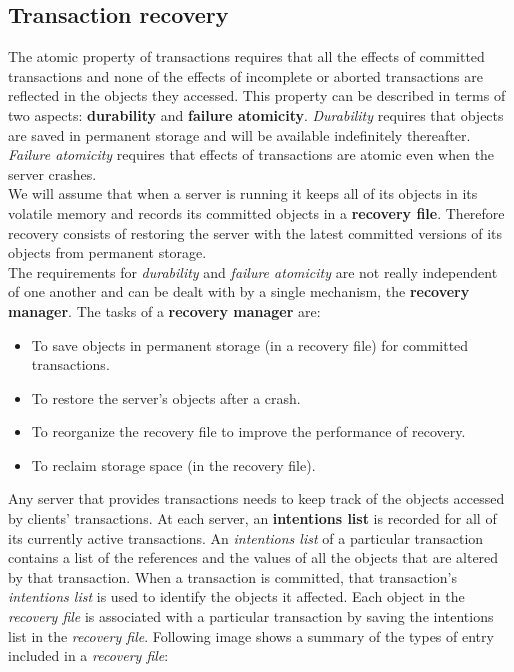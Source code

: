 \subsection{Transaction recovery}
The atomic property of transactions requires that all the effects of committed transactions and none of the effects of incomplete or aborted transactions are reflected in the objects they accessed. This property can be described in terms of two aspects: \textbf{durability} and \textbf{failure atomicity}. \textit{Durability} requires that objects are saved in permanent storage and will be available indefinitely thereafter. \textit{Failure atomicity} requires that effects of transactions are atomic even when the server crashes.\\
We will assume that when a server is running it keeps all of its objects in its volatile memory and records its committed objects in a \textbf{recovery file}. Therefore recovery consists of restoring the server with the latest committed versions of its objects from permanent storage.\\
The requirements for \textit{durability} and \textit{failure atomicity} are not really independent of one another and can be dealt with by a single mechanism, the \textbf{recovery manager}. The tasks of a \textbf{recovery manager} are:
\begin{itemize}
	\item To save objects in permanent storage (in a recovery file) for committed
	transactions.
	\item To restore the server’s objects after a crash.
	\item To reorganize the recovery file to improve the performance of recovery.
	\item To reclaim storage space (in the recovery file).
\end{itemize}
Any server that provides transactions needs to keep track of the objects accessed by clients’ transactions. At each server, an \textbf{intentions list} is recorded for all of its currently active transactions. An \textit{intentions list} of a particular transaction contains a list of the references and the values of all the objects that are altered by that transaction. When a transaction is committed, that transaction’s \textit{intentions list} is used to identify the objects it affected. Each object in the \textit{recovery file} is associated with a particular transaction by saving the intentions list in the
\textit{recovery file}. Following image shows a summary of the types of entry included in a \textit{recovery file}:
